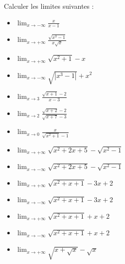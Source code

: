       \begin{exo}
      Calculer les limites suivantes : \\[\baselineskip]
                  \begin{itemize}
                        \item $ \lim_{x\rightarrow -\infty} \frac{x}{x-1} $
                        \item $ \lim_{x\rightarrow +\infty} \frac{\sqrt{x^3 - 1}}{x \sqrt{x}} $
                        \item $ \lim_{x\rightarrow +\infty} \sqrt{x^2 + 1} - x $
                        \item $ \lim_{x\rightarrow -\infty} \sqrt{|x^3 - 1|} + x^2 $
                        \item $ \lim_{x\rightarrow 3} \frac{\sqrt{x+1}-2}{x-3} $
                        \item $ \lim_{x\rightarrow 2} \frac{\sqrt{x+2}-2}{\sqrt{x+7}-3} $
                        \item $ \lim_{x\rightarrow 0} \frac{x}{\sqrt{x^2+1} - 1} $
                        \item $ \lim_{x\rightarrow +\infty} \sqrt{x^2+2x+5}-\sqrt{x^2-1} $
                        \item $ \lim_{x\rightarrow -\infty} \sqrt{x^2+2x+5}-\sqrt{x^2-1} $
                        \item $ \lim_{x\rightarrow +\infty} \sqrt{x^2+x+1}-3x+2 $
                        \item $ \lim_{x\rightarrow -\infty} \sqrt{x^2+x+1}-3x+2 $
                        \item $ \lim_{x\rightarrow +\infty} \sqrt{x^2+x+1}+x+2 $
                        \item $ \lim_{x\rightarrow -\infty} \sqrt{x^2+x+1}+x+2 $
                        \item $ \lim_{x\rightarrow +\infty} \sqrt{x+\sqrt{x}} - \sqrt{x} $            
                  \end{itemize}
      \end{exo}
